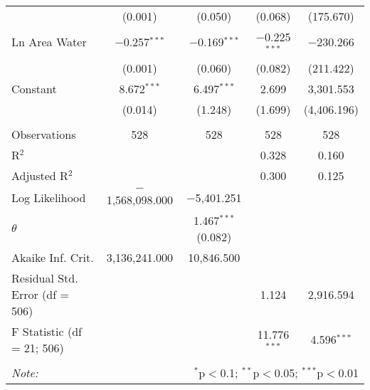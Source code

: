 \begin{table}[!htbp]
\begin{tabular}{@{\extracolsep{5pt}}lcccc}
  & (0.001) & (0.050) & (0.068) & (175.670) \\ 
  Ln Area Water & $-$0.257$^{***}$ & $-$0.169$^{***}$ & $-$0.225$^{***}$ & $-$230.266 \\ 
  & (0.001) & (0.060) & (0.082) & (211.422) \\ 
  Constant & 8.672$^{***}$ & 6.497$^{***}$ & 2.699 & 3,301.553 \\ 
  & (0.014) & (1.248) & (1.699) & (4,406.196) \\ 
 \hline \\[-1.8ex] 
Observations & 528 & 528 & 528 & 528 \\ 
R$^{2}$ &  &  & 0.328 & 0.160 \\ 
Adjusted R$^{2}$ &  &  & 0.300 & 0.125 \\ 
Log Likelihood & $-$1,568,098.000 & $-$5,401.251 &  &  \\ 
$\theta$ &  & 1.467$^{***}$  (0.082) &  &  \\ 
Akaike Inf. Crit. & 3,136,241.000 & 10,846.500 &  &  \\ 
Residual Std. Error (df = 506) &  &  & 1.124 & 2,916.594 \\ 
F Statistic (df = 21; 506) &  &  & 11.776$^{***}$ & 4.596$^{***}$ \\ 
\hline 
\hline \\[-1.8ex] 
\textit{Note:}  & \multicolumn{4}{r}{$^{*}$p$<$0.1; $^{**}$p$<$0.05; $^{***}$p$<$0.01} \\ 
\end{tabular} 
\end{table} 
